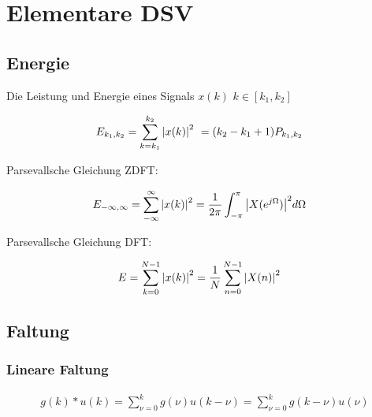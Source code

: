 \documentclass[10pt,a4paper]{article}
\begin{document}
\twocolumn
\pagestyle{fancy}
\section{Elementare DSV}
  \subsection{Energie}
  Die Leistung und Energie eines Signals $x(k)$ $k \in [k_1,k_2]$
  \begin{mdframed}[style=exercise]
    \begin{align}
        E_{k_1,k_2} &=\sum_{k=k_1}^{k_2} \abs{x(k)}^2 \ = (k_2 - k_1 +1) P_{k_1,k_2} 
    \end{align}
  \end{mdframed}
  Parsevallsche Gleichung ZDFT:
  \begin{mdframed}[style=exercise]
    \begin{align}
        E_{-\infty,\infty} &=\sum_{-\infty}^{\infty} \abs{x(k)}^2 = \frac{1}{2\pi}\displaystyle\int_{-\pi}^{\pi} \abs{X(e^{j\Omega})}^2 d\Omega
    \end{align}
  \end{mdframed}
  Parsevallsche Gleichung DFT:
  \begin{mdframed}[style=exercise]
    \begin{align}
        E &=\sum_{k=0}^{N-1} \abs{x(k)}^2 =\frac{1}{N}\sum_{n=0}^{N-1} \abs{X(n)}^2 
    \end{align}
  \end{mdframed}
  \subsection{Faltung}
  \subsubsection{Lineare Faltung}
  \begin{mdframed}[style=exercise]
    \begin{align}
        g(k)*u(k) = \sum_{\nu =0}^{k} g(\nu) u(k-\nu)= \sum_{\nu =0}^{k} g(k-\nu) u(\nu)
    \end{align}
  \end{mdframed}
\end{document}
